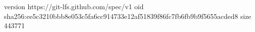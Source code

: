 version https://git-lfs.github.com/spec/v1
oid sha256:ee5c3210bbb8e053c5fa6cc914733e12af51839f86fc7fb6fb9b9f5655acded8
size 443771
